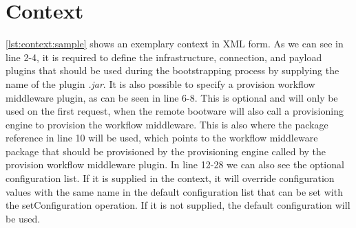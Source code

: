 \section{Context}
\label{implementation:context}

\vspace*{\baselineskip}

\autoref{lst:context:sample} shows an exemplary context in XML form.
As we can see in line 2-4, it is required to define the infrastructure, connection, and payload plugins that should be used during the bootstrapping process by supplying the name of the plugin \textit{.jar}.
It is also possible to specify a provision workflow middleware plugin, as can be seen in line 6-8.
This is optional and will only be used on the first request, when the remote bootware will also call a provisioning engine to provision the workflow middleware.
This is also where the package reference in line 10 will be used, which points to the workflow middleware package that should be provisioned by the provisioning engine called by the provision workflow middleware plugin.
In line 12-28 we can also see the optional configuration list.
If it is supplied in the context, it will override configuration values with the same name in the default configuration list that can be set with the setConfiguration operation.
If it is not supplied, the default configuration will be used.
